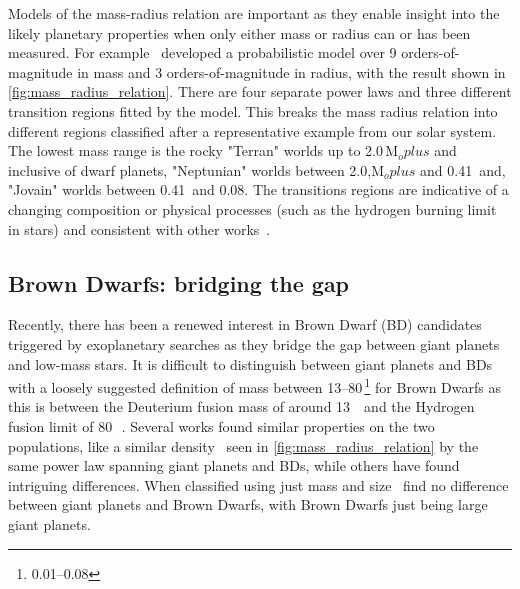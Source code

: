 Models of the mass-radius relation are important as they enable insight into the likely planetary properties when only either mass or radius can or has been measured.
For example~\citet{chen_probabilistic_2016} developed a probabilistic model over 9 orders-of-magnitude in mass and 3 orders-of-magnitude in radius, with the result shown in \cref{fig:mass_radius_relation}.
There are four separate power laws and three different transition regions fitted by the model.
This breaks the mass radius relation into different regions classified after a representative example from our solar system.
The lowest mass range is the rocky "Terran" worlds up to 2.0\,\(\textrm{M}_oplus\) and inclusive of dwarf planets, "Neptunian" worlds between 2.0,\(\textrm{M}_oplus\) and 0.41\,\Mjup{} and, "Jovain" worlds between 0.41\,\Mjup{} and 0.08\Msun{}.
The transitions regions are indicative of a changing composition or physical processes (such as the hydrogen burning limit in stars) and consistent with other works~\citep[e.g.][]{weiss_mass_2013, dieterich_solar_2014, hatzes_definition_2015, rogers_most_2015}.

\subsection{Brown Dwarfs: bridging the gap}
Recently, there has been a renewed interest in Brown Dwarf (BD) candidates triggered by exoplanetary searches as they bridge the gap between giant planets and low-mass stars.
It is difficult to distinguish between giant planets and {BD}s with a loosely suggested definition of mass between 13--80\,\Mjup{}\footnote{0.01--0.08\Msun{}} for Brown Dwarfs as this is between the Deuterium fusion mass of around 13\,\Mjup{}~\citep[e.g.][]{spiegel_deuteriumburning_2011} and the Hydrogen fusion limit of 80\,\Mjup{}~\citep{chabrier_theory_2000, dieterich_solar_2014}.
Several works found similar properties on the two populations, like a similar density~\citep{hatzes_definition_2015, chen_probabilistic_2016} seen in \cref{fig:mass_radius_relation} by the same power law spanning giant planets and {BD}s, while others have found intriguing differences.
When classified using just mass and size~\citet{chen_probabilistic_2016} find no difference between giant planets and Brown Dwarfs, with Brown Dwarfs just being large giant planets.

